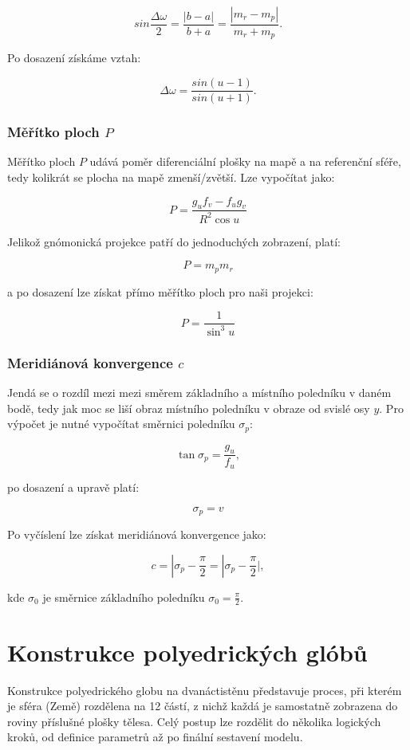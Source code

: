\documentclass[12pt, a4paper]{article}
\begin{document}
$$sin\frac{\Delta\omega}{2}=\frac{|b-a|}{b+a}=\frac{|m_{r}-m_{p}|}{m_{r}+m_{p}}.$$

Po dosazení získáme vztah:

$$\Delta\omega=\frac{sin(u-1)}{sin(u+1)}.$$

\subsubsection{Měřítko ploch $P$}
Měřítko ploch $P$ udává poměr diferenciální plošky na mapě a na referenční sféře, tedy kolikrát se plocha na mapě zmenší/zvětší. Lze vypočítat jako:

$$P = \frac{g_u f_v - f_u g_v}{R^2 \cos u}$$

Jelikož gnómonická projekce patří do jednoduchých zobrazení, platí: 

$$P = m_p m_r$$

a po dosazení lze získat přímo měřítko ploch pro naši projekci:

$$P = \frac{1}{\sin^3 u}$$

\subsubsection{Meridiánová konvergence $c$}
Jendá se o rozdíl mezi mezi směrem základního a místního poledníku v daném bodě, tedy jak moc se liší obraz místního poledníku v obraze od svislé osy $y$. Pro výpočet je nutné vypočítat směrnici poledníku $\sigma_p$:

$$\tan \sigma_p = \frac{g_u}{f_u},$$

po dosazení a upravě platí: 

$$\sigma_p = v$$

Po vyčíslení lze získat meridiánová konvergence jako:

$$c = | \sigma_p - \frac{\pi}{2} = |\sigma_p - \frac{\pi}{2}|,$$

kde $\sigma_0$ je směrnice základního poledníku $\sigma_0 = \frac{\pi}{2}$.

\clearpage
\newpage
\section{Konstrukce polyedrických glóbů}

Konstrukce polyedrického globu na dvanáctistěnu představuje proces, při kterém je sféra (Země) rozdělena na 12 částí, z nichž každá je samostatně zobrazena do roviny příslušné plošky tělesa. Celý postup lze rozdělit do několika logických kroků, od definice parametrů až po finální sestavení modelu.
\end{document}
